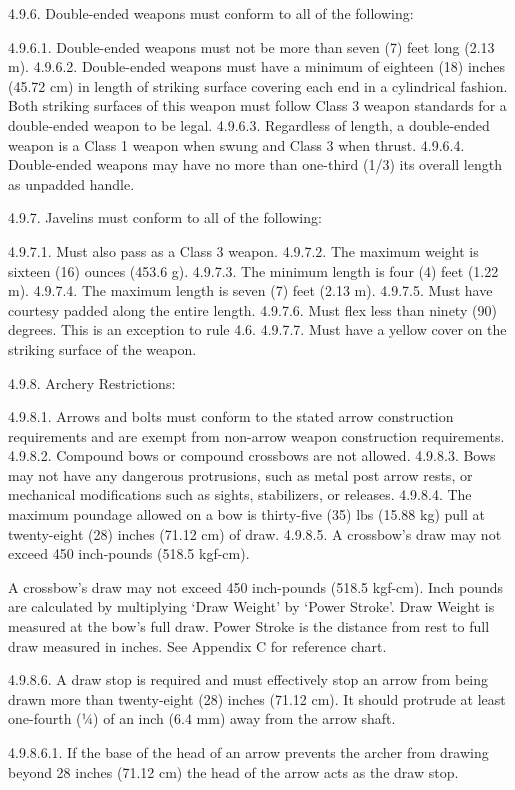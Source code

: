 \documentclass[12pt]{article}
\begin{document}
\begin{level}[start=0]
4.9.6. Double-ended weapons must conform to all of the following:

4.9.6.1. Double-ended weapons must not be more than seven (7) feet long (2.13 m).
4.9.6.2. Double-ended weapons must have a minimum of eighteen (18) inches (45.72 cm) in length of striking surface covering each end in a cylindrical fashion. Both striking surfaces of this weapon must follow Class 3 weapon standards for a double-ended weapon to be legal.
4.9.6.3. Regardless of length, a double-ended weapon is a Class 1 weapon when swung and Class 3 when thrust.
4.9.6.4. Double-ended weapons may have no more than one-third (1/3) its overall length as unpadded handle.

4.9.7. Javelins must conform to all of the following:

4.9.7.1. Must also pass as a Class 3 weapon.
4.9.7.2. The maximum weight is sixteen (16) ounces (453.6 g).
4.9.7.3. The minimum length is four (4) feet (1.22 m).
4.9.7.4. The maximum length is seven (7) feet (2.13 m).
4.9.7.5. Must have courtesy padded along the entire length.
4.9.7.6. Must flex less than ninety (90) degrees. This is an exception to rule 4.6.
4.9.7.7. Must have a yellow cover on the striking surface of the weapon.

4.9.8. Archery Restrictions:

4.9.8.1. Arrows and bolts must conform to the stated arrow construction requirements and are exempt from non-arrow weapon construction requirements.
4.9.8.2. Compound bows or compound crossbows are not allowed.
4.9.8.3. Bows may not have any dangerous protrusions, such as metal post arrow rests, or mechanical modifications such as sights, stabilizers, or releases.
4.9.8.4. The maximum poundage allowed on a bow is thirty-five (35) lbs (15.88 kg) pull at twenty-eight (28) inches (71.12 cm) of draw.
4.9.8.5. A crossbow’s draw may not exceed 450 inch-pounds (518.5 kgf-cm).

A crossbow’s draw may not exceed 450 inch-pounds (518.5 kgf-cm). Inch pounds are calculated by multiplying ‘Draw Weight’ by ‘Power Stroke’. Draw Weight is measured at the bow’s full draw. Power Stroke is the distance from rest to full draw measured in inches. See Appendix C for reference chart.

4.9.8.6. A draw stop is required and must effectively stop an arrow from being drawn more than twenty-eight (28) inches (71.12 cm). It should protrude at least one-fourth (¼) of an inch (6.4 mm) away from the arrow shaft.

4.9.8.6.1. If the base of the head of an arrow prevents the archer from drawing beyond 28 inches (71.12 cm) the head of the arrow acts as the draw stop.


\end{level}
\end{document}
